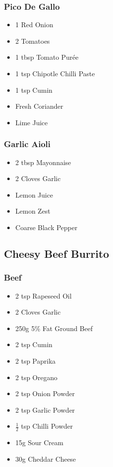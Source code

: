 \documentclass[11pt, english]{article}
\begin{document}
		\subsubsection*{Pico De Gallo}
	
	\begin{itemize}
        \setlength\itemsep{0cm}
                \item 1 Red Onion
		\item 2 Tomatoes
		\item 1 tbsp Tomato Pur\'{e}e
		\item 1 tsp Chipotle Chilli Paste
		\item 1 tsp Cumin
		\item Fresh Coriander
		\item Lime Juice
        \end{itemize}

		\subsubsection*{Garlic Aioli}

	\begin{itemize}
        \setlength\itemsep{0cm}
                \item 2 tbsp Mayonnaise
		\item 2 Cloves Garlic
		\item Lemon Juice
		\item Lemon Zest
		\item Coarse Black Pepper
        \end{itemize}

\newpage

	\subsection{Cheesy Beef Burrito}

		\subsubsection*{Beef}

	\begin{itemize}
        \setlength\itemsep{0cm}
                \item 2 tsp Rapeseed Oil
		\item 2 Cloves Garlic
		\item 250g 5\% Fat Ground Beef
		\item 2 tsp Cumin
		\item 2 tsp Paprika
		\item 2 tsp Oregano
		\item 2 tsp Onion Powder
		\item 2 tsp Garlic Powder
		\item $\frac{1}{2}$ tsp Chilli Powder
		\item 15g Sour Cream
		\item 30g Cheddar Cheese
        \end{itemize}
\end{document}

